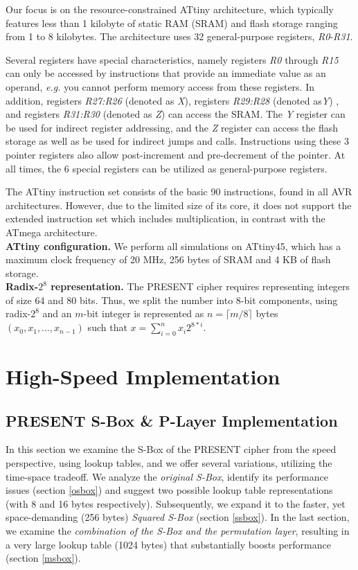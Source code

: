 \documentclass[11pt]{llncs2e} %
\begin{document}
Our focus is on the resource-constrained ATtiny architecture, which typically features less than 1 kilobyte of static RAM (SRAM) and flash storage ranging from 1 to 8 kilobytes. The architecture uses 32 general-purpose registers, \textit{R0}-\textit{R31}.

Several registers have special characteristics, namely registers \textit{R0} through \textit{R15} can only be accessed by instructions that provide an immediate value as an operand, \emph{e.g.} you cannot perform memory access from these registers.
In addition, registers \textit{R27:R26} (denoted as \emph{X}), registers \textit{R29:R28} (denoted as\emph{Y}) , and registers \textit{R31:R30} (denoted as \emph{Z}) can access the SRAM.
The \emph{Y} register can be used for indirect register addressing, and the \emph{Z} register can access the flash storage as well as be used for indirect jumps and calls.
Instructions using these 3 pointer registers also allow post-increment and pre-decrement of the pointer.
At all times, the 6 special registers can be utilized as general-purpose registers.

The ATtiny instruction set consists of the basic 90 instructions, found in all AVR architectures. However, due to the limited size of its core, it does not support the extended instruction set which includes multiplication, in contrast with the ATmega architecture.\\
\textbf{ATtiny configuration.} We perform all simulations on ATtiny45, which has a maximum clock frequency of 20 MHz, 256 bytes of SRAM and 4 KB of flash storage.\\
\textbf{Radix-$2^8$ representation.} The PRESENT cipher requires representing integers of size 64 and 80 bits. Thus, we split the number into 8-bit components, using radix-$2^8$ and an $m$-bit integer is represented as $n=\lceil{m/8}\rceil$ bytes $(x_0,x_1,\dots,x_{n-1})$ such that $x=\sum_{i=0}^n{x_i 2^{8*i}}$.

\section{High-Speed Implementation}

\subsection{PRESENT S-Box \& P-Layer Implementation}\label{sbox}
In this section we examine the S-Box of the PRESENT cipher from the speed perspective, using lookup tables, and we offer several variations, utilizing the time-space tradeoff. We analyze the \emph{original S-Box}, identify its performance issues (section \ref{osbox}) and suggest two possible lookup table representations (with 8 and 16 bytes respectively). Subsequently, we expand it to the faster, yet space-demanding (256 bytes) \emph{Squared S-Box} (section \ref{ssbox}). In the last section, we examine the \emph{combination of the S-Box and the permutation layer}, resulting in a very large lookup table (1024 bytes) that substantially boosts performance (section \ref{msbox}).
\end{document}
